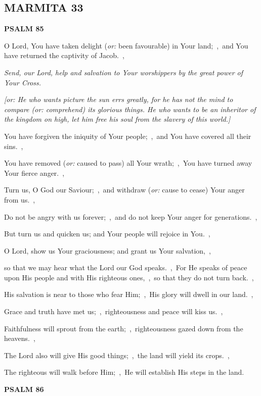 \documentclass[12pt,twoside,a5paper]{article}
\newcommand{\marmita}[1]{\subsection*{MARMITA {#1}}}
\newcommand{\psalm}[1]{\textbf{PSALM {#1}}\nopagebreak}
\newcommand{\qanona}[1]{{\liturgicalhint{Qanona.} \emph{#1}}}
\newcommand{\translationoption}[1]{\emph{or:} #1}
\begin{document}
\marmita{33}

\psalm{85}

\begin{normalparskip}
  O Lord, You have taken delight (\translationoption{been favourable}) in Your land;~\sep\ and You have returned the captivity of Jacob.~\sep

  \qanona{Send, our Lord, help and salvation to Your worshippers by the great power of Your Cross.}

  \emph{[\translationoption{He who wants picture the sun errs greatly, for he has not the mind to compare (\translationoption{comprehend}) its glorious things. He who wants to be an inheritor of the kingdom on high, let him free his soul from the slavery of this world.}]}

  You have forgiven the iniquity of Your people;~\sep\ and You have covered all their sins.~\sep

  You have removed (\translationoption{caused to pass}) all Your wrath;~\sep\ You have turned away Your fierce anger.~\sep

  Turn us, O God our Saviour;~\sep\ and withdraw (\translationoption{cause to cease}) Your anger from us.~\sep

  Do not be angry with us forever;~\sep\ and do not keep Your anger for generations.~\sep

  But turn us and quicken us; and Your people will rejoice in You.~\sep

  O Lord, show us Your graciousness; and grant us Your salvation,~\sep

  so that we may hear what the Lord our God speaks.~\sep\ For He speaks of peace upon His people and with His righteous ones,~\sep\ so that they do not turn back.~\sep

  His salvation is near to those who fear Him;~\sep\ His glory will dwell in our land.~\sep

  Grace and truth have met us;~\sep\ righteousness and peace will kiss us.~\sep

  Faithfulness will sprout from the earth;~\sep\ righteousness gazed down from the heavens.~\sep

  The Lord also will give His good things;~\sep\ the land will yield its crops.~\sep

  The righteous will walk before Him;~\sep\ He will establish His steps in the land.
\end{normalparskip}

\psalm{86}
\end{document}
